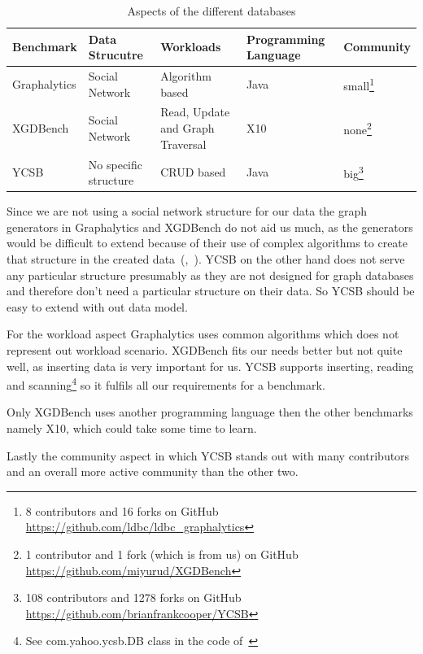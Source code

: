 \begin{table}[!h]
  \caption{Aspects of the different databases}
  \label{tab:benchmarkComparison}
  \begin{minipage}{\textwidth}
    \begin{tabularx}{\textwidth}{ | l | X | X | X | l | }
      \hline
      Benchmark & Data Strucutre & Workloads & Programming Language & Community \\ \hline
      Graphalytics & Social Network & Algorithm based & Java & small\footnote{8 contributors and 16 forks on GitHub \url{https://github.com/ldbc/ldbc_graphalytics}} \\ \hline
      XGDBench & Social Network & Read, Update and Graph Traversal & X10 & none\footnote{1 contributor and 1 fork (which is from us) on GitHub \url{https://github.com/miyurud/XGDBench}} \\ \hline
      YCSB & No specific structure & CRUD based & Java & big\footnote{108 contributors and 1278 forks on GitHub \url{https://github.com/brianfrankcooper/YCSB}} \\
      \hline
    \end{tabularx}
  \end{minipage}
\end{table}

Since we are not using a social network structure for our data the graph generators in Graphalytics and XGDBench do not aid us much,
as the generators would be difficult to extend because of their use of complex algorithms to create that structure in the created data~(\cite{Erling2015},~\cite{Dayarathna2012}).
YCSB on the other hand does not serve any particular structure presumably as they are not designed for graph databases and therefore don't need a particular structure on their data.
So YCSB should be easy to extend with out data model.

For the workload aspect Graphalytics uses common algorithms which does not represent out workload scenario.
XGDBench fits our needs better but not quite well, as inserting data is very important for us.
YCSB supports inserting, reading and scanning\footnote{See com.yahoo.ycsb.DB class in the code of~\cite{Cooper}} so it fulfils all our requirements for a benchmark.

Only XGDBench uses another programming language then the other benchmarks namely X10,
which could take some time to learn.

Lastly the community aspect in which YCSB stands out with many contributors and an overall more active community than the other two.


